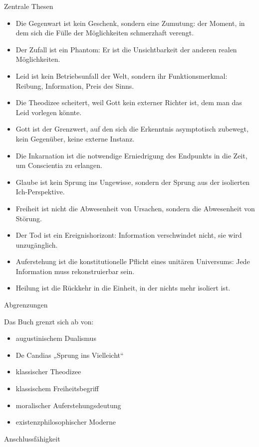 \documentclass[
  ngerman,
]{article}
\begin{document}
Zentrale Thesen

\begin{itemize}
\item
  Die Gegenwart ist kein Geschenk, sondern eine Zumutung: der Moment, in
  dem sich die Fülle der Möglichkeiten schmerzhaft verengt.
\item
  Der Zufall ist ein Phantom: Er ist die Unsichtbarkeit der anderen
  realen Möglichkeiten.
\item
  Leid ist kein Betriebsunfall der Welt, sondern ihr Funktionsmerkmal:
  Reibung, Information, Preis des Sinns.
\item
  Die Theodizee scheitert, weil Gott kein externer Richter ist, dem man
  das Leid vorlegen könnte.
\item
  Gott ist der Grenzwert, auf den sich die Erkenntnis asymptotisch
  zubewegt, kein Gegenüber, keine externe Instanz.
\item
  Die Inkarnation ist die notwendige Erniedrigung des Endpunkts in die
  Zeit, um Conscientia zu erlangen.
\item
  Glaube ist kein Sprung ins Ungewisse, sondern der Sprung aus der
  isolierten Ich-Perspektive.
\item
  Freiheit ist nicht die Abwesenheit von Ursachen, sondern die
  Abwesenheit von Störung.
\item
  Der Tod ist ein Ereignishorizont: Information verschwindet nicht, sie
  wird unzugänglich.
\item
  Auferstehung ist die konstitutionelle Pflicht eines unitären
  Universums: Jede Information muss rekonstruierbar sein.
\item
  Heilung ist die Rückkehr in die Einheit, in der nichts mehr isoliert
  ist.
\end{itemize}

Abgrenzungen

Das Buch grenzt sich ab von:

\begin{itemize}
\item
  augustinischem Dualismus
\item
  De Candias „Sprung ins Vielleicht``
\item
  klassischer Theodizee
\item
  klassischem Freiheitsbegriff
\item
  moralischer Auferstehungsdeutung
\item
  existenzphilosophischer Moderne
\end{itemize}

Anschlussfähigkeit
\end{document}
